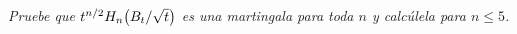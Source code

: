 \emph{
    Pruebe que $t^{n/2}H_n\!\left( B_t/\sqrt{t}\right) $ es una martingala para 
    toda $n$ y calc\'ulela para $n\leq 5$.\pn
}

\afterstatement\pn